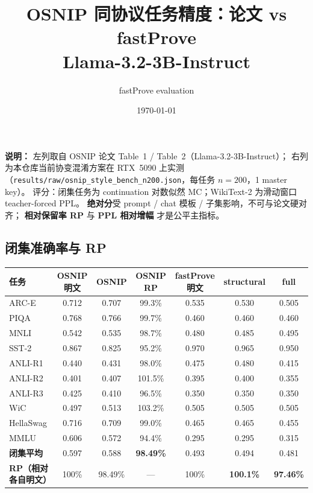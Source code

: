 \documentclass[11pt,a4paper]{article}
\title{\textbf{OSNIP 同协议任务精度：论文 vs fastProve}\\
\large Llama-3.2-3B-Instruct}
\author{fastProve evaluation}
\date{\today}
\begin{document}
\maketitle
\vspace{-1.0em}

\noindent
{\small\color{note}
\textbf{说明：}
左列取自 OSNIP 论文 Table~1 / Table~2（Llama-3.2-3B-Instruct）；
右列为本仓库当前协变混淆方案在 RTX~5090 上实测
（\texttt{results/raw/osnip\_style\_bench\_n200.json}，每任务 $n{=}200$，1 master key）。
评分：闭集任务为 continuation 对数似然 MC；WikiText-2 为滑动窗口 teacher-forced PPL。
\textbf{绝对分}受 prompt / chat 模板 / 子集影响，不可与论文硬对齐；
\textbf{相对保留率 RP} 与 \textbf{PPL 相对增幅} 才是公平主指标。
}

\vspace{0.7em}

\subsection*{闭集准确率与 RP}

\begin{center}
\renewcommand{\arraystretch}{1.18}
\footnotesize
\begin{tabular}{@{}lcccccc@{}}
\toprule
\rowcolor{headerbg}
任务 &
OSNIP 明文 & OSNIP & OSNIP RP &
fastProve 明文 & structural & full \\
\midrule
ARC-E
  & 0.712 & 0.707 & 99.3\%
  & 0.535 & 0.530 & 0.505 \\
PIQA
  & 0.768 & 0.766 & 99.7\%
  & 0.460 & 0.460 & 0.460 \\
MNLI
  & 0.542 & 0.535 & 98.7\%
  & 0.480 & 0.485 & 0.495 \\
SST-2
  & 0.867 & 0.825 & 95.2\%
  & 0.970 & 0.965 & 0.950 \\
ANLI-R1
  & 0.440 & 0.431 & 98.0\%
  & 0.475 & 0.480 & 0.415 \\
ANLI-R2
  & 0.401 & 0.407 & 101.5\%
  & 0.395 & 0.400 & 0.355 \\
ANLI-R3
  & 0.425 & 0.410 & 96.5\%
  & 0.350 & 0.350 & 0.350 \\
WiC
  & 0.497 & 0.513 & 103.2\%
  & 0.505 & 0.505 & 0.505 \\
HellaSwag
  & 0.716 & 0.709 & 99.0\%
  & 0.465 & 0.465 & 0.455 \\
MMLU
  & 0.606 & 0.572 & 94.4\%
  & 0.295 & 0.295 & 0.315 \\
\midrule
\textbf{闭集平均}
  & 0.597 & 0.588 & \textbf{98.49\%}
  & 0.493 & 0.494 & 0.481 \\
\textbf{RP（相对各自明文）}
  & 100\% & 98.49\% & ---
  & 100\% & \textbf{100.1\%} & \textbf{97.46\%} \\
\bottomrule
\end{tabular}
\end{center}
\end{document}
